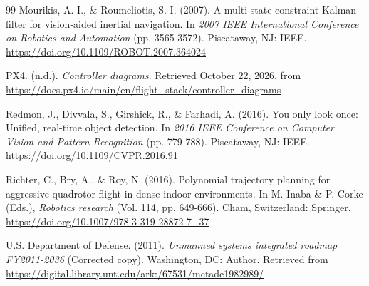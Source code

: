 \begin{thebibliography}{99}
Mourikis, A. I., \& Roumeliotis, S. I. (2007). A multi-state constraint Kalman filter for vision-aided inertial navigation. In \textit{2007 IEEE International Conference on Robotics and Automation} (pp. 3565-3572). Piscataway, NJ: IEEE. \url{https://doi.org/10.1109/ROBOT.2007.364024}

PX4. (n.d.). \textit{Controller diagrams}. Retrieved October 22, 2026, from \url{https://docs.px4.io/main/en/flight_stack/controller_diagrams}

Redmon, J., Divvala, S., Girshick, R., \& Farhadi, A. (2016). You only look once: Unified, real-time object detection. In \textit{2016 IEEE Conference on Computer Vision and Pattern Recognition} (pp. 779-788). Piscataway, NJ: IEEE. \url{https://doi.org/10.1109/CVPR.2016.91}

Richter, C., Bry, A., \& Roy, N. (2016). Polynomial trajectory planning for aggressive quadrotor flight in dense indoor environments. In M. Inaba \& P. Corke (Eds.), \textit{Robotics research} (Vol. 114, pp. 649-666). Cham, Switzerland: Springer. \url{https://doi.org/10.1007/978-3-319-28872-7_37}

U.S. Department of Defense. (2011). \textit{Unmanned systems integrated roadmap FY2011-2036} (Corrected copy). Washington, DC: Author. Retrieved from \url{https://digital.library.unt.edu/ark:/67531/metadc1982989/}

\end{thebibliography}
